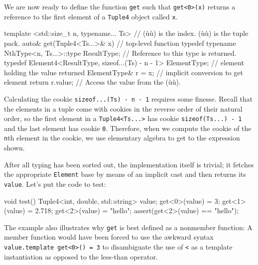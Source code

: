 We are now ready to define the function \lstinline!get! such that
\lstinline!get<0>(x)! returns a reference to the first element of a
\lstinline!Tuple4! object called \lstinline!x!.

\begin{emcppslisting}[emcppsbatch=e37]
template <std::size_t n, typename... Ts>  // (ù{}ù) is the index. (ù{}ù) is the tuple pack.
auto& get(Tuple4<Ts...>& x)          // top-level function
{
    typedef typename NthType<n, Ts...>::type
        ResultType;                  // Reference to this type is returned.
    typedef Element4<ResultType, sizeof...(Ts) - n - 1>
        ElementType;                 // element holding the value returned
    ElementType& r = x;              // implicit conversion to get element
    return r.value;                  // Access the value from the (ù{}ù).
}
\end{emcppslisting}
    

\noindent Calculating the cookie
\lstinline!sizeof...(Ts)!~\lstinline!-!~\lstinline!n!~\lstinline!-!~\lstinline!1!
requires some finesse. Recall that the elements in a tuple come with
cookies in the reverse order of their natural order, so the first
element in a \lstinline!Tuple4<Ts...>! has cookie
\lstinline!sizeof(Ts...)!~\lstinline!-!~\lstinline!1! and the last element has
cookie \lstinline!0!. Therefore, when we compute the cookie of the
\lstinline!n!th element in the cookie, we use elementary algebra to get to
the expression shown.

After all typing has been sorted out, the implementation itself is
trivial; it fetches the appropriate \lstinline!Element! base by means of an
implicit cast and then returns its \lstinline!value!. Let's put the code to
test:

\begin{emcppslisting}[emcppsbatch=e37]
void test()
{
    Tuple4<int, double, std::string> value;
    get<0>(value) = 3;
    get<1>(value) = 2.718;
    get<2>(value) = "hello";
    assert(get<2>(value) == "hello");
}
\end{emcppslisting}
    

\noindent The example also illustrates why \lstinline!get! is best defined as a
nonmember function: A member function would have been forced to use the
awkward syntax
\lstinline!value.template!~\lstinline!get<0>()!~\lstinline!=!~\lstinline!3! to
disambiguate the use of \lstinline!<! as a template instantiation as
opposed to the less-than operator.

